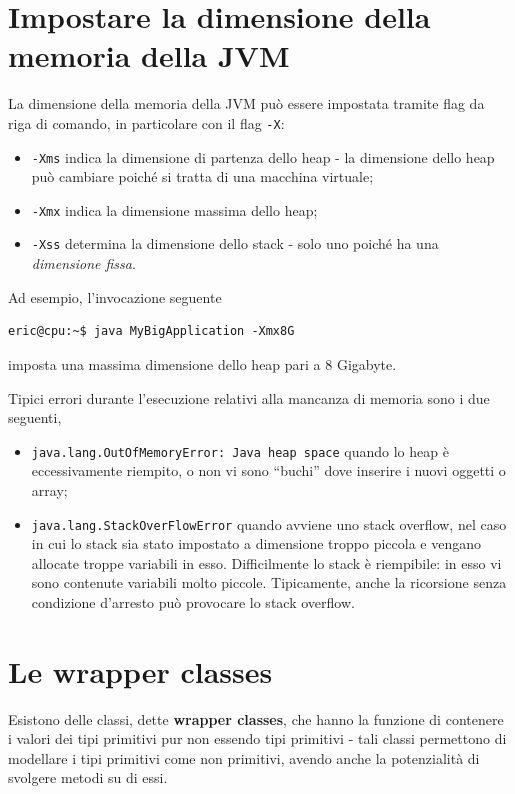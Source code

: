 \documentclass[\fontsizeclass,twocolumn]{\classname}
\theoremstyle{definition}
\theoremstyle{definition}
\begin{document}
\section{Impostare la dimensione della memoria della JVM}

La dimensione della memoria della JVM può essere impostata tramite flag da riga
di comando, in particolare con il flag \texttt{-X}:
\begin{itemize}
    \item \texttt{-Xms} indica la dimensione di partenza dello heap \-- la
        dimensione dello heap può cambiare poiché si tratta di una macchina
        virtuale;
    \item \texttt{-Xmx} indica la dimensione massima dello heap;
    \item \texttt{-Xss} determina la dimensione dello stack \-- solo uno poiché
        ha una \emph{dimensione fissa}.
\end{itemize}

Ad esempio, l'invocazione seguente

\begin{verbatim}
eric@cpu:~$ java MyBigApplication -Xmx8G
\end{verbatim}

imposta una massima dimensione dello heap pari a 8 Gigabyte.

Tipici errori durante l'esecuzione relativi alla mancanza di memoria sono i due
seguenti,
\begin{itemize}
    \item \texttt{java.lang.OutOfMemoryError: Java heap space} quando lo heap è
        eccessivamente riempito, o non vi sono ``buchi'' dove inserire i nuovi
        oggetti o array;
    \item \texttt{java.lang.StackOverFlowError} quando avviene uno stack
        overflow, nel caso in cui lo stack sia stato impostato a dimensione
        troppo piccola e vengano allocate troppe variabili in esso.
        Difficilmente lo stack è riempibile: in esso vi sono contenute
        variabili molto piccole. Tipicamente, anche la ricorsione senza
        condizione d'arresto può provocare lo stack overflow.
\end{itemize}


\section{Le wrapper classes}

Esistono delle classi, dette \textbf{wrapper classes}, che hanno la funzione di
contenere i valori dei tipi primitivi pur non essendo tipi primitivi \-- tali
classi permettono di modellare i tipi primitivi come non primitivi, avendo
anche la potenzialità di svolgere metodi su di essi.
\end{document}
